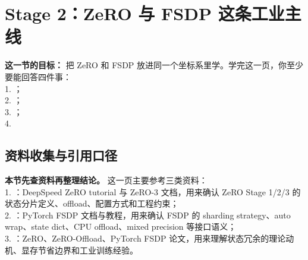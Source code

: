 
\section{Stage 2：ZeRO 与 FSDP 这条工业主线}

\begin{conceptbox}
\textbf{这一节的目标：} 把 ZeRO 和 FSDP 放进同一个坐标系里学。学完这一页，你至少要能回答四件事：\\
1. ；\\
2. ；\\
3. ；\\
4. 
\end{conceptbox}


\subsection*{资料收集与引用口径}

\begin{conceptbox}
\textbf{本节先查资料再整理结论。} 这一页主要参考三类资料：\\
1. ：DeepSpeed ZeRO tutorial 与 ZeRO-3 文档，用来确认 ZeRO Stage 1/2/3 的状态分片定义、offload、配置方式和工程约束；\\
2. ：PyTorch FSDP 文档与教程，用来确认 FSDP 的 sharding strategy、auto wrap、state dict、CPU offload、mixed precision 等接口语义；\\
3. ：ZeRO、ZeRO-Offload、PyTorch FSDP 论文，用来理解状态冗余的理论动机、显存节省边界和工业训练经验。
\end{conceptbox}

